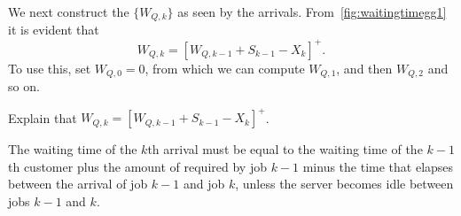 We next construct the  $\{W_{Q,k}\}$ as seen by the arrivals.
From~\cref{fig:waitingtimegg1} it is evident that 
\begin{equation}\label{eq:56}
  W_{Q,k} = [W_{Q,k-1} + S_{k-1}-X_k]^+.
\end{equation}
To use this, set $W_{Q,0}=0$, from which we can compute $W_{Q,1}$, and then $W_{Q,2}$ and so on.

\begin{extra}
Explain that  $W_{Q,k} = [W_{Q,k-1} + S_{k-1}-X_k]^+$. 
  \begin{solution}
The waiting time of the $k$th arrival must be equal to the waiting time of the $k-1$th customer plus the amount of  required by job $k-1$ minus the time that elapses between the arrival of job $k-1$ and job $k$, unless the server becomes idle between jobs $k-1$ and $k$.
  \end{solution}
\end{extra}

